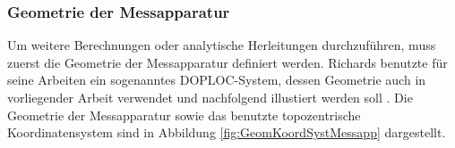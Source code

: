 \documentclass[a4paper,12pt]{article}
\numberwithin{equation}{section}
\begin{document}
\subsubsection{Geometrie der Messapparatur}
Um weitere Berechnungen oder analytische Herleitungen durchzuführen, muss zuerst die Geometrie der Messapparatur definiert werden. Richards benutzte für seine Arbeiten ein sogenanntes DOPLOC-System, dessen Geometrie auch in vorliegender Arbeit verwendet und nachfolgend illustiert werden soll \cite[S. 1732]{Richards.1961}. Die Geometrie der Messapparatur sowie das benutzte topozentrische Koordinatensystem sind in Abbildung \ref{fig:GeomKoordSystMessapp} dargestellt.
\begin{figure}[h]
\centering



\begin{tikzpicture}[x=0.75pt,y=0.75pt,yscale=-1,xscale=1]


\end{tikzpicture}
\end{figure}
\end{document}
